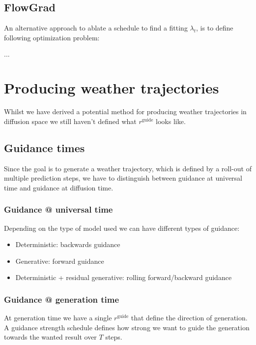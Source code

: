 \documentclass[a4paper,12pt]{article}
\begin{document}
\subsection{FlowGrad}

An alternative approach to ablate a schedule to find a fitting $\lambda_t$, is to define following optimization problem:

...

\section{Producing weather trajectories}

Whilst we have derived a potential method for producing weather trajectories in diffusion space we still haven't defined what $r^\text{guide}$ looks like.

\subsection{Guidance times}
Since the goal is to generate a weather trajectory, which is defined by a roll-out of multiple prediction steps, we have to distinguish between guidance at universal time and guidance at diffusion time.

\subsubsection{Guidance @ universal time}

Depending on the type of model used we can have different types of guidance: 
\begin{itemize}
    \item Deterministic: backwards guidance
    \item Generative: forward guidance
    \item Deterministic + residual generative: rolling forward/backward guidance
\end{itemize}

\subsubsection{Guidance @ generation time}
At generation time we have a single $r^\text{guide}$ that define the direction of generation. A guidance strength schedule defines how strong we want to guide the generation towards the wanted result over $T$ steps.
\end{document}
